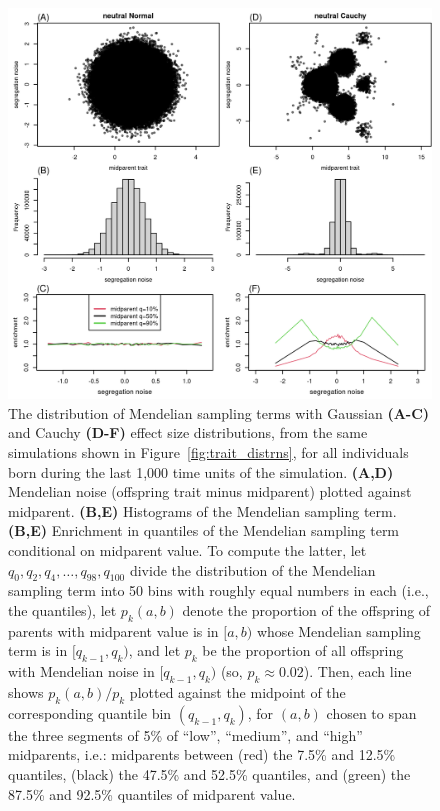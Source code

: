 \documentclass{article}
\newcommand{\1}{\mathbbm{1}}
\theoremstyle{remark}
\theoremstyle{definition}
\begin{document}
\begin{figure}
    \begin{center}
        \includegraphics{sims/neutral_seg_noise}
    \end{center}
    \caption{
        The distribution of Mendelian sampling terms
        with Gaussian \textbf{(A-C)} and Cauchy \textbf{(D-F)} effect size distributions,
        from the same simulations shown in Figure~\ref{fig:trait_distrns},
        for all individuals born during the last 1,000 time units of the simulation.
        \textbf{(A,D)} Mendelian noise (offspring trait minus midparent) plotted against midparent.
        \textbf{(B,E)} Histograms of the Mendelian sampling term.
        \textbf{(B,E)} Enrichment in quantiles of the Mendelian sampling term conditional on midparent value.
        To compute the latter,
        let $q_0, q_2, q_4, \ldots, q_{98}, q_{100}$ divide the distribution of the Mendelian sampling term
        into 50 bins with roughly equal numbers in each (i.e., the quantiles),
        let $p_k(a,b)$ denote the proportion of the offspring of parents with midparent value
        is in $[a, b)$ whose Mendelian sampling term is in $[q_{k-1}, q_k)$,
        and let $p_k$ be the proportion of all offspring with Mendelian noise in $[q_{k-1}, q_k)$
        (so, $p_k \approx 0.02$).
        Then, each line shows $p_k(a,b)/p_k$
        plotted against the midpoint of the corresponding quantile bin $(q_{k-1},q_k)$,
        for $(a,b)$ chosen to span the three segments of 5\% of
        ``low'', ``medium'', and ``high'' midparents, i.e.:
        midparents between (red) the 7.5\% and 12.5\% quantiles,
        (black) the 47.5\% and 52.5\% quantiles, and
        (green) the 87.5\% and 92.5\% quantiles of midparent value.
        \label{fig:seg_noise}
    }
\end{figure}
\end{document}

